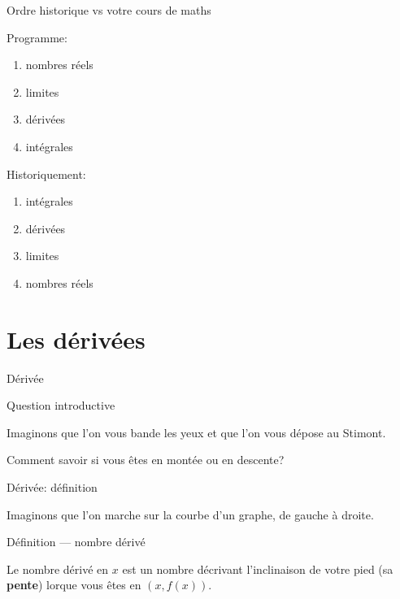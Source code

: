 \documentclass{beamer}
\begin{document}
\begin{frame}
    {Ordre historique vs votre cours de maths}

    Programme:
    \begin{enumerate}
        \item nombres réels
        \item limites
        \item dérivées
        \item intégrales
    \end{enumerate}
    \pause{}

    Historiquement:
    \begin{enumerate}
        \item intégrales
            \pause{}
        \item dérivées
            \pause{}
        \item limites
            \pause{}
        \item nombres réels
    \end{enumerate}
\end{frame}

\section{Les dérivées}

\begin{frame}
    {Dérivée}

    \begin{exampleblock}
        {Question introductive}

        Imaginons que l'on vous bande les yeux et que l'on vous dépose au Stimont.

        \pause{}
        Comment savoir si vous êtes en montée ou en descente?
    \end{exampleblock}
\end{frame}

\begin{frame}
    {Dérivée: définition}

    Imaginons que l'on marche sur la courbe d'un graphe, de gauche à droite.

    \begin{exampleblock}
        {Définition --- nombre dérivé}

        Le nombre dérivé en $x$ est un nombre décrivant l'inclinaison de votre pied (sa \textbf{pente}) lorque vous êtes en $(x, f(x))$.
    \end{exampleblock}

    \begin{plot}{0.25}{-10}{-2}{10}{10}
    \end{plot}
\end{frame}
\end{document}
